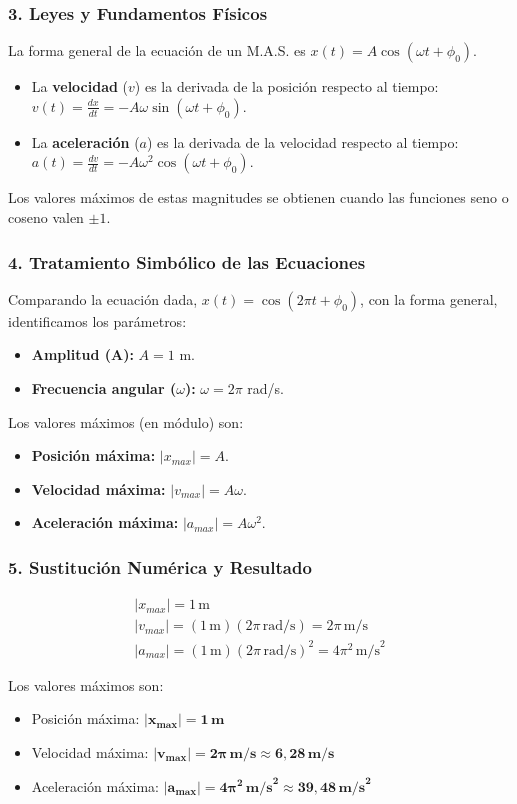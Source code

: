\subsubsection*{3. Leyes y Fundamentos Físicos}
La forma general de la ecuación de un M.A.S. es $x(t) = A\cos(\omega t + \phi_0)$.
\begin{itemize}
    \item La \textbf{velocidad} ($v$) es la derivada de la posición respecto al tiempo: $v(t) = \frac{dx}{dt} = -A\omega\sin(\omega t + \phi_0)$.
    \item La \textbf{aceleración} ($a$) es la derivada de la velocidad respecto al tiempo: $a(t) = \frac{dv}{dt} = -A\omega^2\cos(\omega t + \phi_0)$.
\end{itemize}
Los valores máximos de estas magnitudes se obtienen cuando las funciones seno o coseno valen $\pm 1$.

\subsubsection*{4. Tratamiento Simbólico de las Ecuaciones}
Comparando la ecuación dada, $x(t) = \cos(2\pi t + \phi_0)$, con la forma general, identificamos los parámetros:
\begin{itemize}
    \item \textbf{Amplitud (A):} $A = 1$ m.
    \item \textbf{Frecuencia angular ($\omega$):} $\omega = 2\pi$ rad/s.
\end{itemize}
Los valores máximos (en módulo) son:
\begin{itemize}
    \item \textbf{Posición máxima:} $|x_{max}| = A$.
    \item \textbf{Velocidad máxima:} $|v_{max}| = A\omega$.
    \item \textbf{Aceleración máxima:} $|a_{max}| = A\omega^2$.
\end{itemize}

\subsubsection*{5. Sustitución Numérica y Resultado}
\begin{gather}
    |x_{max}| = 1 \, \text{m} \\
    |v_{max}| = (1 \, \text{m})(2\pi \, \text{rad/s}) = 2\pi \, \text{m/s} \\
    |a_{max}| = (1 \, \text{m})(2\pi \, \text{rad/s})^2 = 4\pi^2 \, \text{m/s}^2
\end{gather}
\begin{cajaresultado}
Los valores máximos son:
\begin{itemize}
    \item Posición máxima: $\boldsymbol{|x_{max}| = 1 \, \textbf{m}}$
    \item Velocidad máxima: $\boldsymbol{|v_{max}| = 2\pi \, \textbf{m/s} \approx 6,28 \, \textbf{m/s}}$
    \item Aceleración máxima: $\boldsymbol{|a_{max}| = 4\pi^2 \, \textbf{m/s}^2 \approx 39,48 \, \textbf{m/s}^2}$
\end{itemize}
\end{cajaresultado}

